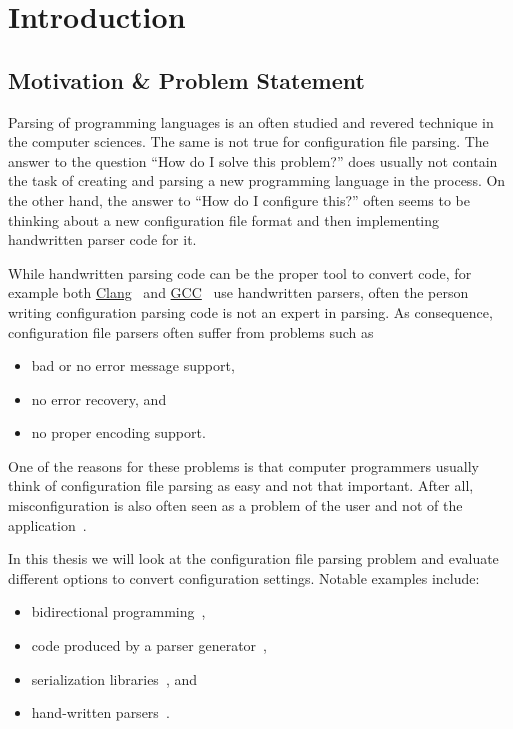 \chapter{Introduction}

\section{Motivation \& Problem Statement}

Parsing of programming languages is an often studied and revered technique in the computer sciences. The same is not true for configuration file parsing. The answer to the question “How do I solve this problem?” does usually not contain the task of creating and parsing a new programming language in the process. On the other hand, the answer to “How do I configure this?” often seems to be thinking about a new configuration file format and then implementing handwritten parser code for it.

While handwritten parsing code can be the proper tool to convert code, for example both \href{http://clang.llvm.org}{Clang}~\cite{bendersky2012clang} and \href{http://gcc.gnu.org}{GCC}~\cite{myers2008cparser} use handwritten parsers, often the person writing configuration parsing code is not an expert in parsing. As consequence, configuration file parsers often suffer from problems such as

\begin{itemize}
  \item bad or no error message support,
  \item no error recovery, and
  \item no proper encoding support.
\end{itemize}

One of the reasons for these problems is that computer programmers usually think of configuration file parsing as easy and not that important. After all, misconfiguration is also often seen as a problem of the user and not of the application~\cite{xu2013not}.

In this thesis we will look at the configuration file parsing problem and evaluate different options to convert configuration settings. Notable examples include:

\begin{itemize}
  \item bidirectional programming~\cite{foster2005combinators, bohannon2006relational, lutterkort2008augeas, ko2016bigul, raab2016improving},
  \item code produced by a parser generator~\cite{denny2008ielr, parr2014adaptive, warth2016modular, bates2017aprt},
  \item serialization libraries~\cite{sumaray2012cds, pacini2015performance}, and
  \item hand-written parsers~\cite{myers2008cparser, bendersky2012clang}.
\end{itemize}


